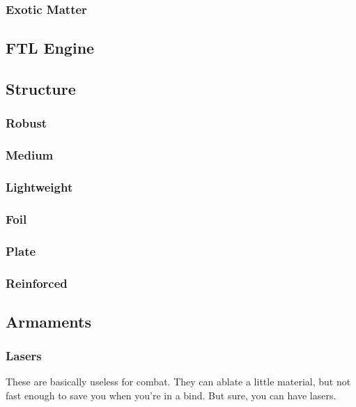 \subsubsection{Exotic Matter}

\subsection{FTL Engine}

\subsection{Structure}

\subsubsection{Robust}

\subsubsection{Medium}

\subsubsection{Lightweight}

\subsubsection{Foil}

\subsubsection{Plate}

\subsubsection{Reinforced}

\subsection{Armaments}

\subsubsection{Lasers}
\par
These are basically useless for combat. They can ablate a little material, but not fast enough to save you when you're in a bind. But sure, you can have lasers.

